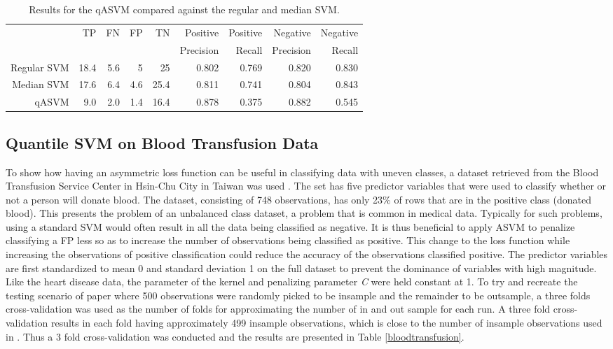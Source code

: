 \documentclass[twoside,11pt]{article}
\begin{document}
\begin{table}[htbp]\label{table:HeartDisease3}
  \centering
    \begin{tabular}{rrrrrrrrr}
    \hline
       & \multirow{2}{*}{TP}    & \multirow{2}{*}{FN}    & \multirow{2}{*}{FP}    & \multirow{2}{*}{TN} & Positive & Positive & Negative & Negative\\
&&&&&  Precision &  Recall &  Precision &  Recall \bigstrut\\
    \hline
    \hline
    Regular SVM & 18.4  & 5.6   & 5     & 25    & 0.802 & 0.769 & 0.820 & 0.830 \bigstrut[t]\\
    Median SVM & 17.6  & 6.4   & 4.6   & 25.4  & 0.811 & 0.741 & 0.804 & 0.843 \\
    qASVM & 9.0   & 2.0   & 1.4   & 16.4  & 0.878 & 0.375 & 0.882 & 0.545 \bigstrut[b]\\
    \hline
    \hline
    \end{tabular}%
    \caption{Results for the qASVM compared against the regular and median SVM.}
\end{table}%


\subsection{Quantile SVM on Blood Transfusion Data}
To show how having an asymmetric loss function can be useful in classifying data with uneven classes, a dataset retrieved from the Blood Transfusion Service Center in Hsin-Chu City in Taiwan was used \citep{Yeh09}. The set has five predictor variables that were used to classify whether or not a person will donate blood. The dataset, consisting of 748 observations, has only 23\% of rows that are in the positive class (donated blood). This presents the problem of an unbalanced class dataset, a problem that is common in medical data. Typically for such problems, using a standard SVM would often result in all the data being classified as negative. It is thus beneficial to apply ASVM to penalize classifying a FP less so as to increase the number of observations being classified as positive. This change to the loss function while increasing the observations of positive classification could reduce the accuracy of the observations classified positive. The predictor variables are first standardized to mean 0 and standard deviation 1 on the full dataset to prevent the dominance of variables with high magnitude. Like the heart disease data, the parameter of the kernel and penalizing parameter \emph{C} were held constant at 1. To try and recreate the testing scenario of \citet{Yeh09} paper where 500 observations were randomly picked to be insample and the remainder to be outsample, a three folds cross-validation was used as the number of folds for approximating the number of in and out sample for each run. A three fold cross-validation results in each fold having approximately 499 insample observations, which is close to the number of insample observations used in \citet{Yeh09}. Thus a 3 fold cross-validation was conducted and the results are presented in Table \ref{bloodtransfusion}.
\end{document}

